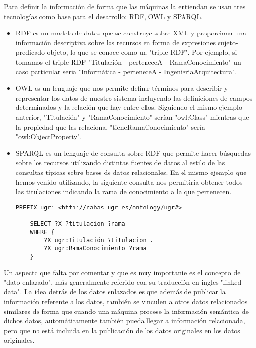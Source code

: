 \newpage
Para definir la información de forma que las máquinas la entiendan se usan tres tecnologías como base para el desarrollo: RDF, OWL y SPARQL.

\begin{itemize}
	\item RDF es un modelo de datos que se construye sobre XML y proporciona una información descriptiva sobre los recursos en forma de expresiones sujeto-predicado-objeto, lo que se conoce como un "triple RDF". 
	\newline Por ejemplo, si tomamos el triple RDF "Titulación - perteneceA - RamaConocimiento" un caso particular sería "Informática - perteneceA - IngenieríaArquitectura".
	\item OWL es un lenguaje que nos permite definir términos para describir y representar los datos de nuestro sistema incluyendo las definiciones de campos determinados y la relación que hay entre ellos. 
	\newline Siguiendo el mismo ejemplo anterior, "Titulación" y "RamaConocimiento" serían "owl:Class" mientras que la propiedad que las relaciona, "tieneRamaConocimiento" sería "owl:ObjectProperty".
	\item SPARQL es un lenguaje de consulta sobre RDF que permite hacer búsquedas sobre los recursos utilizando distintas fuentes de datos al estilo de las consultas típicas sobre bases de datos relacionales. 
	\newline En el mismo ejemplo que hemos venido utilizando, la siguiente consulta nos permitiría obtener todos las titulaciones indicando la rama de conocimiento a la que pertenecen.
	\begin{lstlisting}[language=sparql,caption={Consulta SPARQL de ejemplo},label={lst:consulta_sparql_ejemplo}]
    PREFIX ugr: <http://cabas.ugr.es/ontology/ugr#>
	 
    SELECT ?X ?titulacion ?rama
    WHERE {
        ?X ugr:Titulación ?titulacion .
        ?X ugr:RamaConocimiento ?rama
    }
	 \end{lstlisting}
\end{itemize}

Un aspecto que falta por comentar y que es muy importante es el concepto de "dato enlazado", más generalmente referido con su traducción en ingles "linked data". La idea detrás de los datos enlazados es que además de publicar la información referente a los datos, también se vinculen a otros datos relacionados similares de forma que cuando una máquina procese la información semántica de dichos datos, automáticamente también pueda llegar a información relacionada, pero que no está incluida en la publicación de los datos originales en los datos originales.

